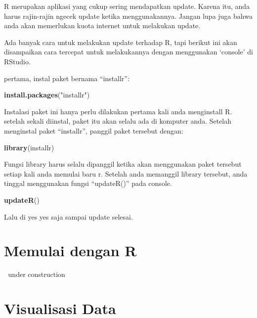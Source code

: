 \documentclass[
]{book}
\newenvironment{Shaded}{\begin{snugshade}}{\end{snugshade}}
\newcommand{\KeywordTok}[1]{\textcolor[rgb]{0.13,0.29,0.53}{\textbf{#1}}}
\newcommand{\NormalTok}[1]{#1}
\newcommand{\StringTok}[1]{\textcolor[rgb]{0.31,0.60,0.02}{#1}}
\begin{document}
R merupakan aplikasi yang cukup sering mendapatkan update. Karena itu, anda harus rajin-rajin ngecek update ketika menggunakannya. Jangan lupa juga bahwa anda akan memerlukan kuota internet untuk melakukan update.

Ada banyak cara untuk melakukan update terhadap R, tapi berikut ini akan disampaikan cara tercepat untuk melakukannya dengan menggunakan `console' di RStudio.

pertama, instal paket bernama ``installr'':

\begin{Shaded}
\begin{Highlighting}[]
\KeywordTok{install.packages}\NormalTok{(}\StringTok{"installr"}\NormalTok{)}
\end{Highlighting}
\end{Shaded}

Instalasi paket ini hanya perlu dilakukan pertama kali anda menginstall R. setelah sekali diinstal, paket itu akan selalu ada di komputer anda. Setelah menginstal paket ``installr'', panggil paket tersebut dengan:

\begin{Shaded}
\begin{Highlighting}[]
\KeywordTok{library}\NormalTok{(installr)}
\end{Highlighting}
\end{Shaded}

Fungsi library harus selalu dipanggil ketika akan menggunakan paket tersebut setiap kali anda memulai baru r. Setelah anda memanggil library tersebut, anda tinggal menggunakan fungsi ``updateR()'' pada console.

\begin{Shaded}
\begin{Highlighting}[]
\KeywordTok{updateR}\NormalTok{()}
\end{Highlighting}
\end{Shaded}

Lalu di yes yes saja sampai update selesai.

\hypertarget{intro}{%
\chapter{Memulai dengan R}\label{intro}}

🚧 under construction 🚧

\hypertarget{visualisasi-data}{%
\chapter{Visualisasi Data}\label{visualisasi-data}}
\end{document}
